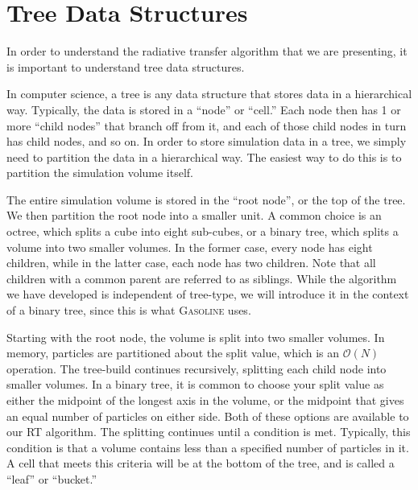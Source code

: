 

\section{Tree Data Structures}
\label{sec:treestruct}

In order to understand the radiative transfer algorithm that we are presenting, it is important to understand tree data structures.

In computer science, a tree is any data structure that stores data in a hierarchical way. Typically, the data is stored in a ``node'' or ``cell.'' Each node then has 1 or more ``child nodes'' that branch off from it, and each of those child nodes in turn has child nodes, and so on. In order to store simulation data in a tree, we simply need to partition the data in a hierarchical way. The easiest way to do this is to partition the simulation volume itself.

The entire simulation volume is stored in the ``root node'', or the top of the tree. We then partition the root node into a smaller unit. A common choice is an octree, which splits a cube into eight sub-cubes, or a binary tree, which splits a volume into two smaller volumes. In the former case, every node has eight children, while in the latter case, each node has two children. Note that all children with a common parent are referred to as siblings. While the algorithm we have developed is independent of tree-type, we will introduce it in the context of a binary tree, since this is what \textsc{Gasoline} uses.

Starting with the root node, the volume is split into two smaller volumes. In memory, particles are partitioned about the split value, which is an $\mathcal{O}(N)$ operation. The tree-build continues recursively, splitting each child node into smaller volumes. In a binary tree, it is common to choose your split value as either the midpoint of the longest axis in the volume, or the midpoint that gives an equal number of particles on either side. Both of these options are available to our RT algorithm. The splitting continues until a condition is met. Typically, this condition is that a volume contains less than a specified number of particles in it. A cell that meets this criteria will be at the bottom of the tree, and is called a ``leaf'' or ``bucket.''

